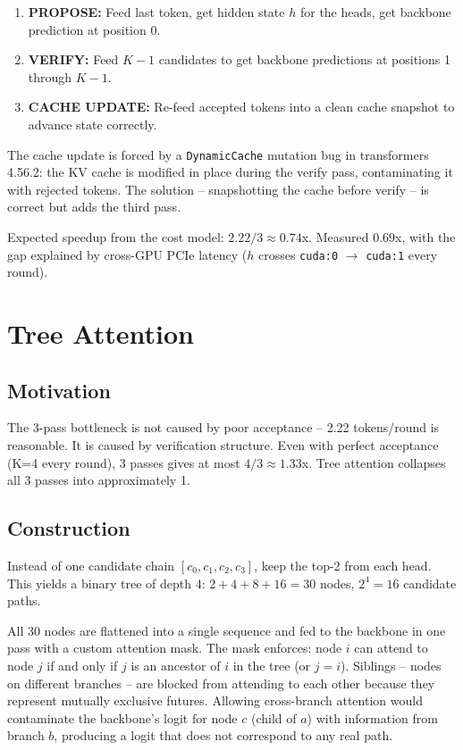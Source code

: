 \documentclass[12pt, a4paper]{article}
\begin{document}
\begin{enumerate}
    \item \textbf{PROPOSE:} Feed last token, get hidden state $h$ for the heads,
          get backbone prediction at position 0.
    \item \textbf{VERIFY:} Feed $K-1$ candidates to get backbone predictions at
          positions 1 through $K-1$.
    \item \textbf{CACHE UPDATE:} Re-feed accepted tokens into a clean cache snapshot
          to advance state correctly.
\end{enumerate}

The cache update is forced by a \texttt{DynamicCache} mutation bug in transformers
4.56.2: the KV cache is modified in place during the verify pass, contaminating it
with rejected tokens. The solution -- snapshotting the cache before verify -- is
correct but adds the third pass.

Expected speedup from the cost model: $2.22 / 3 \approx 0.74$x. Measured 0.69x,
with the gap explained by cross-GPU PCIe latency ($h$ crosses \texttt{cuda:0}
$\to$ \texttt{cuda:1} every round).

\section{Tree Attention}

\subsection{Motivation}

The 3-pass bottleneck is not caused by poor acceptance -- 2.22 tokens/round is
reasonable. It is caused by verification structure. Even with perfect acceptance
(K=4 every round), 3 passes gives at most $4/3 \approx 1.33$x. Tree attention
collapses all 3 passes into approximately 1.

\subsection{Construction}

Instead of one candidate chain $[c_0, c_1, c_2, c_3]$, keep the top-2 from each
head. This yields a binary tree of depth 4: $2 + 4 + 8 + 16 = 30$ nodes,
$2^4 = 16$ candidate paths.

All 30 nodes are flattened into a single sequence and fed to the backbone in one
pass with a custom attention mask. The mask enforces: node $i$ can attend to node
$j$ if and only if $j$ is an ancestor of $i$ in the tree (or $j = i$). Siblings --
nodes on different branches -- are blocked from attending to each other because they
represent mutually exclusive futures. Allowing cross-branch attention would
contaminate the backbone's logit for node $c$ (child of $a$) with information from
branch $b$, producing a logit that does not correspond to any real path.
\end{document}
